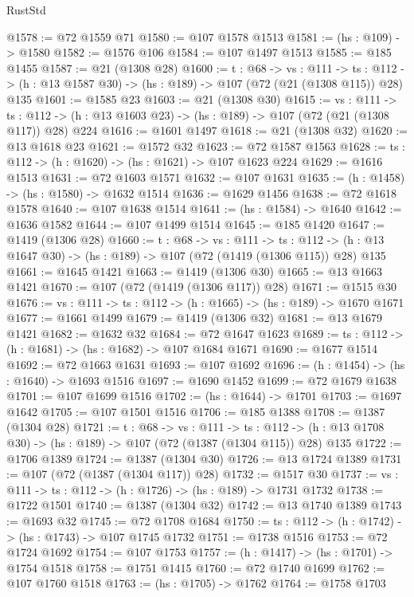\begin{lexlean}{RustStd}
\begin{coremodule}
@1578 := @72 @1559 @71
@1580 := @107 @1578 @1513
@1581 := (hs : @109) -> @1580
@1582 := @1576 @106
@1584 := @107 @1497 @1513
@1585 := @185 @1455
@1587 := @21 (@1308 @28)
@1600 := {t : @68} ->
  {vs : @111} ->
  {ts : @112} -> (h : @13 @1587 @30) -> (hs : @189) -> @107 (@72 (@21 (@1308 @115)) @28) @135
@1601 := @1585 @23
@1603 := @21 (@1308 @30)
@1615 := {vs : @111} ->
  {ts : @112} -> (h : @13 @1603 @23) -> (hs : @189) -> @107 (@72 (@21 (@1308 @117)) @28) @224
@1616 := @1601 @1497
@1618 := @21 (@1308 @32)
@1620 := @13 @1618 @23
@1621 := @1572 @32
@1623 := @72 @1587 @1563
@1628 := {ts : @112} -> (h : @1620) -> (hs : @1621) -> @107 @1623 @224
@1629 := @1616 @1513
@1631 := @72 @1603 @1571
@1632 := @107 @1631
@1635 := (h : @1458) -> (hs : @1580) -> @1632 @1514
@1636 := @1629 @1456
@1638 := @72 @1618 @1578
@1640 := @107 @1638 @1514
@1641 := (hs : @1584) -> @1640
@1642 := @1636 @1582
@1644 := @107 @1499 @1514
@1645 := @185 @1420
@1647 := @1419 (@1306 @28)
@1660 := {t : @68} ->
  {vs : @111} ->
  {ts : @112} -> (h : @13 @1647 @30) -> (hs : @189) -> @107 (@72 (@1419 (@1306 @115)) @28) @135
@1661 := @1645 @1421
@1663 := @1419 (@1306 @30)
@1665 := @13 @1663 @1421
@1670 := @107 (@72 (@1419 (@1306 @117)) @28)
@1671 := @1515 @30
@1676 := {vs : @111} -> {ts : @112} -> (h : @1665) -> (hs : @189) -> @1670 @1671
@1677 := @1661 @1499
@1679 := @1419 (@1306 @32)
@1681 := @13 @1679 @1421
@1682 := @1632 @32
@1684 := @72 @1647 @1623
@1689 := {ts : @112} -> (h : @1681) -> (hs : @1682) -> @107 @1684 @1671
@1690 := @1677 @1514
@1692 := @72 @1663 @1631
@1693 := @107 @1692
@1696 := (h : @1454) -> (hs : @1640) -> @1693 @1516
@1697 := @1690 @1452
@1699 := @72 @1679 @1638
@1701 := @107 @1699 @1516
@1702 := (hs : @1644) -> @1701
@1703 := @1697 @1642
@1705 := @107 @1501 @1516
@1706 := @185 @1388
@1708 := @1387 (@1304 @28)
@1721 := {t : @68} ->
  {vs : @111} ->
  {ts : @112} -> (h : @13 @1708 @30) -> (hs : @189) -> @107 (@72 (@1387 (@1304 @115)) @28) @135
@1722 := @1706 @1389
@1724 := @1387 (@1304 @30)
@1726 := @13 @1724 @1389
@1731 := @107 (@72 (@1387 (@1304 @117)) @28)
@1732 := @1517 @30
@1737 := {vs : @111} -> {ts : @112} -> (h : @1726) -> (hs : @189) -> @1731 @1732
@1738 := @1722 @1501
@1740 := @1387 (@1304 @32)
@1742 := @13 @1740 @1389
@1743 := @1693 @32
@1745 := @72 @1708 @1684
@1750 := {ts : @112} -> (h : @1742) -> (hs : @1743) -> @107 @1745 @1732
@1751 := @1738 @1516
@1753 := @72 @1724 @1692
@1754 := @107 @1753
@1757 := (h : @1417) -> (hs : @1701) -> @1754 @1518
@1758 := @1751 @1415
@1760 := @72 @1740 @1699
@1762 := @107 @1760 @1518
@1763 := (hs : @1705) -> @1762
@1764 := @1758 @1703

\end{coremodule}
\end{lexlean}
